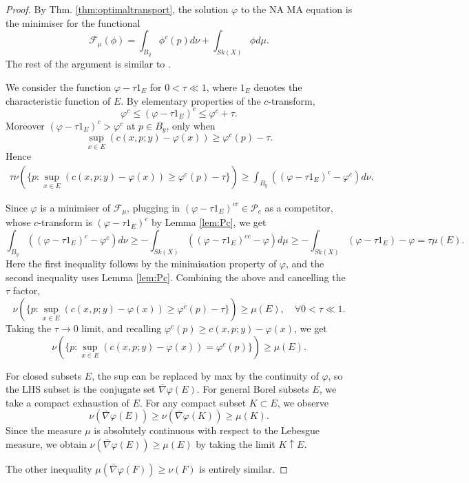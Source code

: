 \documentclass[a4paper]{article}
\theoremstyle{definition}
\begin{document}
	
	
	
	\begin{proof}
	By Thm. \ref{thm:optimaltransport}, the solution $\varphi$ to the NA MA equation is the minimiser for the functional
	\[
	\mathcal{F}_\mu(\phi)=  \int_{B_y}  \phi^c(p)   d\nu+  \int_{Sk(X)} \phi d\mu.
	\]
	The rest of the argument is similar to \cite[Prop. 2.16]{LiFano}.
	
	
	


		We consider the function $\varphi-\tau 1_E$ for $0<\tau \ll 1$, where $1_E$ denotes the characteristic function of $E$. By elementary properties of the $c$-transform,
		\[
		\varphi^c \leq (\varphi-\tau 1_E)^c\leq \varphi^c+\tau.
		\]
		Moreover $(\varphi-\tau 1_E)^c >\varphi^c$ at $p\in B_y$, only when 
		\[
		\sup_{x\in E}( c(x,p;y)-\varphi(x) )\geq \varphi^c(p)-\tau.
		\]
		Hence
		\[
		\begin{split}
			\tau \nu (\{ p: \sup_{x\in E} ( c(x,p;y)-\varphi(x)  ) \geq \varphi^c(p)-\tau  \} )
			\geq  \int_{B_y} ((\varphi-\tau 1_E)^c-\varphi^c)  d\nu.
		\end{split}
		\]
		
		
		Since $\varphi$ is a minimiser of $\mathcal{F}_\mu$, plugging in $(\varphi-\tau 1_E)^{cc}\in \mathcal{P}_c$ as a competitor, whose $c$-transform is $(\varphi-\tau 1_E)^c$ by Lemma \ref{lem:Pc}, 
		we get
		\[
		\int_{B_y} ((\varphi-\tau 1_E)^c-\varphi^c)d\nu \geq - \int_{Sk(X)} ((\varphi-\tau 1_E)^{cc}- \varphi)d\mu \geq - \int_{Sk(X)} (\varphi-\tau 1_E)- \varphi=\tau \mu(E).
		\]
		Here the first inequality follows by the minimisation property of $\varphi$, and the second inequality uses Lemma \ref{lem:Pc}. Combining the above and cancelling the $\tau $ factor, 
		\[
		\nu( \{ p: \sup_{x\in E} ( c(x,p;y) -\varphi(x)  ) \geq \varphi^c(p)-\tau   \} ) \geq \mu(E), \quad \forall 0<\tau \ll 1. 
		\]
		Taking the $\tau \to 0$ limit, and recalling $\varphi^c(p)\geq c(x,p;y)-\varphi(x)$, we get
		\[
		\nu( \{ p: \sup_{x\in E} ( c(x,p;y)-\varphi(x)  ) = \varphi^c(p)   \} )  \geq \mu(E).
		\]
		
		
		
		For closed subsets $E$, the sup can be replaced by max by the continuity of $\varphi$, so the LHS subset is the conjugate set  $\bar{\nabla}\varphi(E)$. For general Borel subsets $E$, we take a compact exhaustion of $E$. For any compact subset $K\subset E$, we observe
		\[
		\nu(  \bar{\nabla}\varphi(E) )\geq \nu( \bar{\nabla} \varphi(K))  \geq \mu(K).
		\]
		Since the measure $\mu$ is absolutely continuous with respect to the Lebesgue measure, we obtain $\nu(\bar{\nabla}\varphi(E)) \geq\mu(E) $ by taking the limit $K\uparrow E$.
		
		
		The other inequality $\mu(	\bar{\nabla}\varphi (F))\geq \nu(F)$ is entirely similar.
	\end{proof}
	
\end{document}
